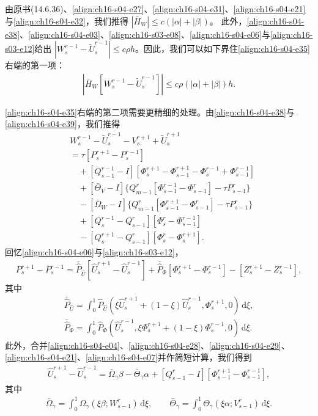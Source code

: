 ﻿\documentclass[../../main.tex]{subfiles}
\begin{document}
由原书(14.6.36)、\eqref{align:ch16-s04-e27}、\eqref{align:ch16-s04-e31}、\eqref{align:ch16-s04-e21}与\eqref{align:ch16-s04-e32}，我们推得 $|\bar H_W|\leqslant c(|\alpha|+|\beta|)$。
此外，\eqref{align:ch16-s04-e38}、\eqref{align:ch16-s04-e03}、\eqref{align:ch16-s03-e08}、\eqref{align:ch16-s04-e06}与\eqref{align:ch16-s03-e12}给出 $|W_s^{r-1}-\tilde U_s^{r-1}|\leqslant c\rho h$。因此，我们可以如下界住\eqref{align:ch16-s04-e35}右端的第一项：
\begin{align}
|\bar H_W[W_s^{r-1}-\tilde U_s^{r-1}]|\leqslant c\rho(|\alpha|+|\beta|)h.
\label{align:ch16-s04-e42}
\end{align}

\eqref{align:ch16-s04-e35}右端的第二项需要更精细的处理。由\eqref{align:ch16-s04-e38}与\eqref{align:ch16-s04-e39}，我们推得
\begin{align}
&W_s^{r-1}-\tilde U_s^{r-1}-V_s^{r+1}+\tilde U_s^{r+1}\nonumber\\
&=\tau[P_s^{r+1}-P_s^{r-1}]\nonumber\\
&\quad+[Q_{s-1}^{r-1}-I][\Phi_s^{r+1}-\Phi_{s-1}^{r+1}-\Phi_s^{r-1}+\Phi_{s-1}^{r-1}]\nonumber\\
&\quad+[\bar\Theta_V-I]\{Q_{m-1}^r[\Phi_{s-1}^{r-1}-\Phi_{s-1}^r]-\tau P_{s-1}^r\}\nonumber\\
&\quad-[\bar\Omega_W-I]\{Q_{m-1}^r[\Phi_{s-1}^{r+1}-\Phi_{s-1}^r]-\tau P_{s-1}^r\}\nonumber\\
&\quad+[Q_s^{r-1}-Q_{s-1}^r][\Phi_s^r-\Phi_{s-1}^{r-1}]\nonumber\\
&\quad-[Q_s^{r+1}-Q_{s-1}^r][\Phi_s^r-\Phi_s^{r+1}].
\label{align:ch16-s04-e43}
\end{align}
回忆\eqref{align:ch16-s04-e06}与\eqref{align:ch16-s03-e12}，
\begin{align}
P_s^{r+1}-P_s^{r-1}=\bar{\hat P}_{\hat U}[\hat U_s^{r+1}-\hat U_s^{r-1}]+\bar{\hat P}_\Phi[\Phi_s^{r+1}-\Phi_s^{r-1}]-[Z_s^{r+1}-Z_s^{r-1}],
\label{align:ch16-s04-e44}
\end{align}
其中
\begin{align}
\bar{\hat P}_{\hat U}=\int_0^1\hat P_{\hat U}(\xi\hat U_s^{r+1}+(1-\xi)\hat U_s^{r-1},\Phi_s^{r+1},0)\,\mathrm{d}\xi,
\label{align:ch16-s04-e45}\\
\bar{\hat P}_\Phi=\int_0^1\hat P_\Phi(\hat U_s^{r-1},\xi\Phi_s^{r+1}+(1-\xi)\Phi_s^{r-1},0)\,\mathrm{d}\xi.
\label{align:ch16-s04-e46}
\end{align}
此外，合并\eqref{align:ch16-s04-e04}、\eqref{align:ch16-s04-e28}、\eqref{align:ch16-s04-e29}、\eqref{align:ch16-s04-e21}、\eqref{align:ch16-s04-e07}并作简短计算，我们得到
\begin{align}
\hat U_s^{r+1}-\hat U_s^{r-1}=\bar\Omega_\gamma\beta-\bar\Theta_\gamma\alpha+[Q_{s-1}^r-I][\Phi_{s-1}^{r+1}-\Phi_{s-1}^{r-1}],
\label{align:ch16-s04-e47}
\end{align}
其中
\begin{align}
\bar\Omega_\gamma=\int_0^1\Omega_\gamma(\xi\beta;W_{s-1}^r)\,\mathrm{d}\xi,\qquad\bar\Theta_\gamma=\int_0^1\Theta_\gamma(\xi\alpha;V_{s-1}^{r})\,\mathrm{d}\xi.
\label{align:ch16-s04-e48}
\end{align}
\end{document}
